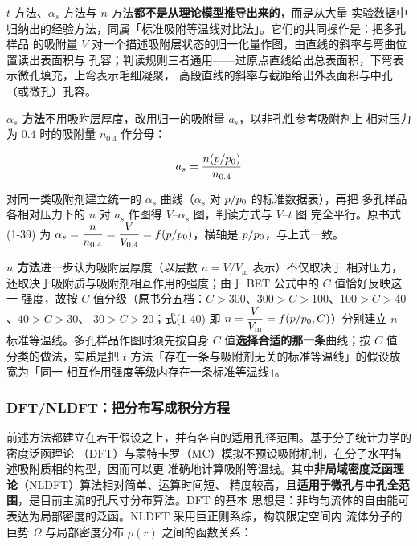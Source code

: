 $t$ 方法、$\alpha_s$ 方法与 $n$ 方法\textbf{都不是从理论模型推导出来的}，而是从大量
实验数据中归纳出的经验方法，同属「标准吸附等温线对比法」。它们的共同操作是：把多孔样品
的吸附量 $V$ 对一个描述吸附层状态的归一化量作图，由直线的斜率与弯曲位置读出表面积与
孔容；判读规则三者通用——过原点直线给出总表面积，下弯表示微孔填充，上弯表示毛细凝聚，
高段直线的斜率与截距给出外表面积与中孔（或微孔）孔容。

\textbf{$\alpha_s$ 方法}不用吸附层厚度，改用归一的吸附量 $a_s$，以非孔性参考吸附剂上
相对压力为 $0.4$ 时的吸附量 $n_{0.4}$ 作分母：

\begin{equation}\label{eq:as}
a_s=\frac{n\!\left(p/p_{0}\right)}{n_{0.4}}
\end{equation}

对同一类吸附剂建立统一的 $\alpha_s$ 曲线（$\alpha_s$ 对 $p/p_{0}$ 的标准数据表），再把
多孔样品各相对压力下的 $n$ 对 $a_s$ 作图得 $V$--$\alpha_s$ 图，判读方式与 $V$--$t$ 图
完全平行。原书式(1-39) 为
$\alpha_s=\dfrac{n}{n_{0.4}}=\dfrac{V}{V_{0.4}}=f\!\left(p/p_{0}\right)$，横轴是
$p/p_{0}$，与上式一致。

\textbf{$n$ 方法}进一步认为吸附层厚度（以层数 $n=V/V_{\mathrm{m}}$ 表示）不仅取决于
相对压力，还取决于吸附质与吸附剂相互作用的强度；由于 BET 公式中的 $C$ 值恰好反映这一
强度，故按 $C$ 值分级（原书分五档：$C>300$、$300>C>100$、$100>C>40$、$40>C>30$、
$30>C>20$；式(1-40) 即 $n=\dfrac{V}{V_{\mathrm{m}}}=f\!\left(p/p_{0},C\right)$）分别建立
$n$ 标准等温线。多孔样品作图时须先按自身 $C$ 值\textbf{选择合适的那一条}曲线；按 $C$ 值
分类的做法，实质是把 $t$ 方法「存在一条与吸附剂无关的标准等温线」的假设放宽为「同一
相互作用强度等级内存在一条标准等温线」。

\subsubsection{DFT/NLDFT：把分布写成积分方程}

前述方法都建立在若干假设之上，并有各自的适用孔径范围。基于分子统计力学的密度泛函理论
（DFT）与蒙特卡罗（MC）模拟不预设吸附机制，在分子水平描述吸附质相的构型，因而可以更
准确地计算吸附等温线。其中\textbf{非局域密度泛函理论}（NLDFT）算法相对简单、运算时间短、
精度较高，且\textbf{适用于微孔与中孔全范围}，是目前主流的孔尺寸分布算法。DFT 的基本
思想是：非均匀流体的自由能可表达为局部密度的泛函。NLDFT 采用巨正则系综，构筑限定空间内
流体分子的巨势 $\Omega$ 与局部密度分布 $\rho(r)$ 之间的函数关系：

